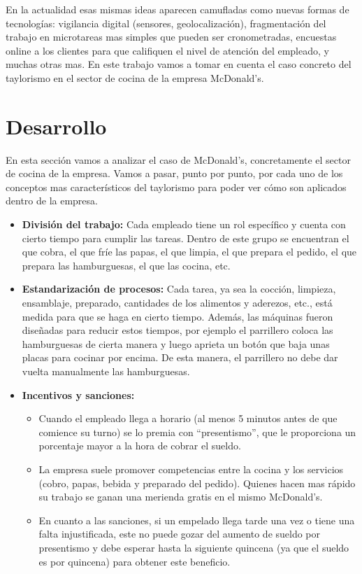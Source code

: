 \documentclass[12pt]{article}
\begin{document}
  En la actualidad esas mismas ideas aparecen camufladas como nuevas formas de tecnologías: vigilancia digital (sensores, geolocalización), fragmentación del trabajo en microtareas mas simples que pueden ser cronometradas, encuestas online a los clientes para que califiquen el nivel de atención del empleado, y muchas otras mas. En este trabajo vamos a tomar en cuenta el caso concreto del taylorismo en el sector de cocina de la empresa McDonald's.

  \section{Desarrollo}
  En esta sección vamos a analizar el caso de McDonald's, concretamente el sector de cocina de la empresa. Vamos a pasar, punto por punto, por cada uno de los conceptos mas característicos del taylorismo para poder ver cómo son aplicados dentro de la empresa.

  \begin{itemize}
	\item \textbf{División del trabajo:} Cada empleado tiene un rol específico y cuenta con cierto tiempo para cumplir las tareas. Dentro de este grupo se encuentran el que cobra, el que fríe las papas, el que limpia, el que prepara el pedido, el que prepara las hamburguesas, el que las cocina, etc.

	\item \textbf{Estandarización de procesos:} Cada tarea, ya sea la cocción, limpieza, ensamblaje, preparado, cantidades de los alimentos y aderezos, etc., está medida para que se haga en cierto tiempo. Además, las máquinas fueron diseñadas para reducir estos tiempos, por ejemplo el parrillero coloca las hamburguesas de cierta manera y luego aprieta un botón que baja unas placas para cocinar por encima. De esta manera, el parrillero no debe dar vuelta manualmente las hamburguesas.

	\item \textbf{Incentivos y sanciones:}\begin{itemize}
	  \item  Cuando el empleado llega a horario (al menos 5 minutos antes de que comience su turno) se lo premia con ``presentismo'', que le proporciona un porcentaje mayor a la hora de cobrar el sueldo.

	  \item La empresa suele promover competencias entre la cocina y los servicios (cobro, papas, bebida y preparado del pedido). Quienes hacen mas rápido su trabajo se ganan una merienda gratis en el mismo McDonald's.

	  \item En cuanto a las sanciones, si un empelado llega tarde una vez o tiene una falta injustificada, este no puede gozar del aumento de sueldo por presentismo y debe esperar hasta la siguiente quincena (ya que el sueldo es por quincena) para obtener este beneficio.
	\end{itemize}
  \end{itemize}
\end{document}
